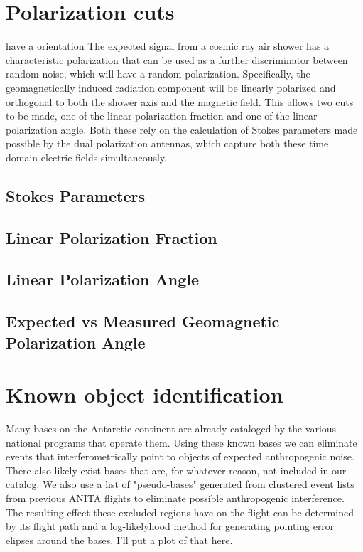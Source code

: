 \section{Polarization cuts}
	have a  orientation The expected signal from a cosmic ray air shower has a characteristic polarization that can be used as a further discriminator between random noise, which will have a random polarization.  Specifically, the geomagnetically induced radiation component will be linearly polarized and orthogonal to both the shower axis and the magnetic field.  This allows two cuts to be made, one of the linear polarization fraction and one of the linear polarization angle.  Both these rely on the calculation of Stokes parameters made possible by the dual polarization antennas, which capture both these time domain electric fields simultaneously.

	\subsection{Stokes Parameters}
		
	\subsection{Linear Polarization Fraction}
		
	\subsection{Linear Polarization Angle}

	\subsection{Expected vs Measured Geomagnetic Polarization Angle}
		
\section{Known object identification}
	Many bases on the Antarctic continent are already cataloged by the various national programs that operate them.  Using these known bases we can eliminate events that interferometrically point to objects of expected anthropogenic noise.  There also likely exist bases that are, for whatever reason, not included in our catalog.  We also use a list of "pseudo-bases" generated from clustered event lists from previous ANITA flights to eliminate possible anthropogenic interference.  The resulting effect these excluded regions have on the flight can be determined by its flight path and a log-likelyhood method for generating pointing error elipses around the bases.  I'll put a plot of that here.
